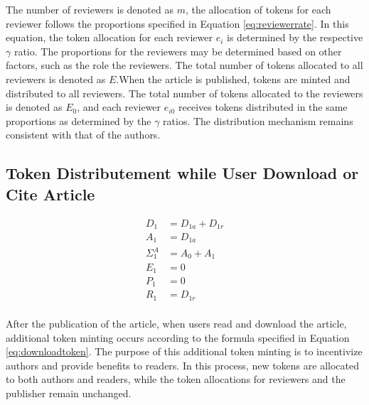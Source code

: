 \documentclass[lettersize,journal]{IEEEtran}
\begin{document}
The number of reviewers is denoted as $m$, the allocation of tokens for each reviewer follows the proportions specified in Equation \ref{eq:reviewerrate}. In this equation, the token allocation for each reviewer $e_i$ is determined by the respective $\gamma$ ratio. The proportions for the reviewers may be determined based on other factors, such as the role the reviewers. The total number of tokens allocated to all reviewers is denoted as $E$.When the article is published, tokens are minted and distributed to all reviewers. The total number of tokens allocated to the reviewers is denoted as $E_0$, and each reviewer $e_{i0}$ receives tokens distributed in the same proportions as determined by the $\gamma$ ratios. The distribution mechanism remains consistent with that of the authors.

\subsection{Token Distributement while User Download or Cite Article}


\begin{equation}
  \begin{aligned}
    D_1 &= D_{1a} + D_{1r} \\
    A_1 &= D_{1a} \\
    \Sigma^A_1 &= A_0 + A_1 \\
    E_1 &= 0 \\
    P_1 &= 0 \\
    R_1 &= D_{1r} \\
  \end{aligned}
  \label{eq:downloadtoken}
\end{equation}

After the publication of the article, when users read and download the article, additional token minting occurs according to the formula specified in Equation \ref{eq:downloadtoken}. The purpose of this additional token minting is to incentivize authors and provide benefits to readers. In this process, new tokens are allocated to both authors and readers, while the token allocations for reviewers and the publisher remain unchanged.
\end{document}
